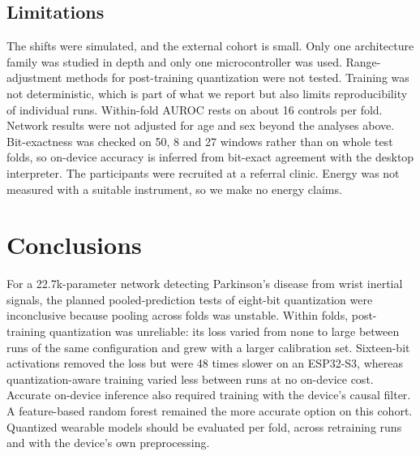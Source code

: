 \documentclass[preprint,12pt]{elsarticle}
\begin{document}
\subsection{Limitations}
The shifts were simulated, and the external cohort is small. Only one architecture family was studied in depth and only one microcontroller was used. Range-adjustment methods for post-training quantization were not tested. Training was not deterministic, which is part of what we report but also limits reproducibility of individual runs. Within-fold AUROC rests on about 16 controls per fold. Network results were not adjusted for age and sex beyond the analyses above. Bit-exactness was checked on 50, 8 and 27 windows rather than on whole test folds, so on-device accuracy is inferred from bit-exact agreement with the desktop interpreter. The participants were recruited at a referral clinic. Energy was not measured with a suitable instrument, so we make no energy claims.

\section{Conclusions}
\label{sec:conclusion}
For a 22.7k-parameter network detecting Parkinson's disease from wrist inertial signals, the planned pooled-prediction tests of eight-bit quantization were inconclusive because pooling across folds was unstable. Within folds, post-training quantization was unreliable: its loss varied from none to large between runs of the same configuration and grew with a larger calibration set. Sixteen-bit activations removed the loss but were 48 times slower on an ESP32-S3, whereas quantization-aware training varied less between runs at no on-device cost. Accurate on-device inference also required training with the device's causal filter. A feature-based random forest remained the more accurate option on this cohort. Quantized wearable models should be evaluated per fold, across retraining runs and with the device's own preprocessing.

\appendix
\end{document}
